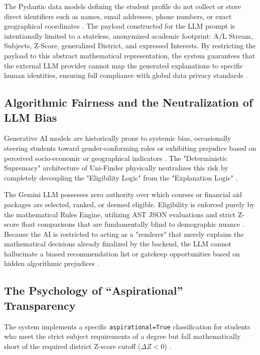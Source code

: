 \documentclass[conference]{IEEEtran}
\begin{document}
The Pydantic data models defining the student profile do not collect or store direct identifiers such as names, email addresses, phone numbers, or exact geographical coordinates \cite{silva2026systematic}. The payload constructed for the LLM prompt is intentionally limited to a stateless, anonymized academic footprint: A/L Stream, Subjects, Z-Score, generalized District, and expressed Interests. By restricting the payload to this abstract mathematical representation, the system guarantees that the external LLM provider cannot map the generated explanations to specific human identities, ensuring full compliance with global data privacy standards \cite{springer2024genai_sl}.

\subsection{Algorithmic Fairness and the Neutralization of LLM Bias}
Generative AI models are historically prone to systemic bias, occasionally steering students toward gender-conforming roles or exhibiting prejudice based on perceived socio-economic or geographical indicators \cite{springer2024genai_sl}. The "Deterministic Supremacy" architecture of Uni-Finder physically neutralizes this risk by completely decoupling the "Eligibility Logic" from the "Explanation Logic" \cite{wang2023finding}.

The Gemini LLM possesses zero authority over which courses or financial aid packages are selected, ranked, or deemed eligible. Eligibility is enforced purely by the mathematical Rules Engine, utilizing AST JSON evaluations and strict Z-score float comparisons that are fundamentally blind to demographic nuance \cite{seu2024stream}. Because the AI is restricted to acting as a "renderer" that merely explains the mathematical decisions already finalized by the backend, the LLM cannot hallucinate a biased recommendation list or gatekeep opportunities based on hidden algorithmic prejudices \cite{wang2023finding}.

\subsection{The Psychology of ``Aspirational'' Transparency}
The system implements a specific \texttt{aspirational=True} classification for students who meet the strict subject requirements of a degree but fall mathematically short of the required district Z-score cutoff ($\Delta Z < 0$) \cite{island2025admission, seu2024stream}.
\end{document}
